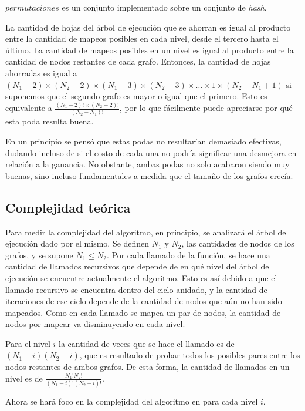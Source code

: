$permutaciones$ es un conjunto implementado sobre un conjunto de \emph{hash}.

La cantidad de hojas del árbol de ejecución que se ahorran es igual al
producto entre la cantidad de mapeos posibles en cada nivel, desde el tercero
hasta el último. La cantidad de mapeos posibles en un nivel es igual al
producto entre la cantidad de nodos restantes de cada grafo. Entonces, la
cantidad de hojas ahorradas es igual a $(N_1 - 2) \times (N_2 - 2) \times
(N_1 - 3) \times (N_2 - 3) \times \dots \times 1 \times (N_2 - N_1 + 1)$ si
suponemos que el segundo grafo es mayor o igual que el primero. Esto es
equivalente a $\frac{(N_1 - 2)! \times (N_2 - 2)!}{(N_2 - N_1)!}$, por lo que
fácilmente puede apreciarse por qué esta poda resulta buena.

En un principio se pensó que estas podas no resultarían demasiado efectivas,
dudando incluso de si el costo de cada una no podría significar una
desmejora en relación a la ganancia. No obstante, ambas podas no solo
acabaron siendo muy buenas, sino incluso fundamentales a medida que el tamaño de los
grafos crecía.

\subsection{Complejidad teórica}

Para medir la complejidad del algoritmo, en principio, se analizará el
árbol de ejecución dado por el mismo. Se definen $N_1$ y $N_2$, las cantidades
de nodos de los grafos, y se supone $N_1 \leq N_2$. Por cada llamado de
la función, se hace una cantidad de llamados recursivos que depende de en qué
nivel del árbol de ejecución se encuentre actualmente el algoritmo. Esto es
así debido a que el llamado recursivo se encuentra dentro del ciclo anidado,
y la cantidad de iteraciones de ese ciclo depende de la cantidad de nodos que
aún no han sido mapeados. Como en cada llamado se mapea un par de nodos, la
cantidad de nodos por mapear va disminuyendo en cada nivel.

Para el nivel $i$ la cantidad de veces que se hace el llamado es de
$(N_1 - i)  (N_2 - i)$, que es resultado de probar todos los posibles
pares entre los nodos restantes de ambos grafos. De esta forma, la cantidad de
llamados en un nivel es de
$\frac{N_1!  N_2!}{(N_1 - i)!  (N_2 - i)!}$.

Ahora se hará foco en la complejidad del algoritmo en para cada nivel $i$.

